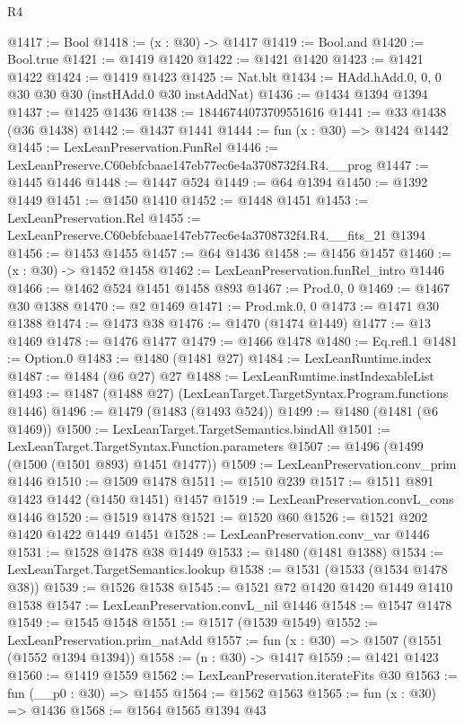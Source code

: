 \begin{lexlean}{R4}
\begin{coremodule}
@1417 := Bool
@1418 := (x : @30) -> @1417
@1419 := Bool.and
@1420 := Bool.true
@1421 := @1419 @1420
@1422 := @1421 @1420
@1423 := @1421 @1422
@1424 := @1419 @1423
@1425 := Nat.blt
@1434 := HAdd.hAdd.{0, 0, 0} @30 @30 @30 (instHAdd.{0} @30 instAddNat)
@1436 := @1434 @1394 @1394
@1437 := @1425 @1436
@1438 := 18446744073709551616
@1441 := @33 @1438 (@36 @1438)
@1442 := @1437 @1441
@1444 := fun (x : @30) => @1424 @1442
@1445 := LexLeanPreservation.FunRel
@1446 := LexLeanPreserve.C60ebfcbaae147eb77ec6e4a3708732f4.R4.__prog
@1447 := @1445 @1446
@1448 := @1447 @524
@1449 := @64 @1394
@1450 := @1392 @1449
@1451 := @1450 @1410
@1452 := @1448 @1451
@1453 := LexLeanPreservation.Rel
@1455 := LexLeanPreserve.C60ebfcbaae147eb77ec6e4a3708732f4.R4.__fits_21 @1394
@1456 := @1453 @1455
@1457 := @64 @1436
@1458 := @1456 @1457
@1460 := (x : @30) -> @1452 @1458
@1462 := LexLeanPreservation.funRel_intro @1446
@1466 := @1462 @524 @1451 @1458 @893
@1467 := Prod.{0, 0}
@1469 := @1467 @30 @1388
@1470 := @2 @1469
@1471 := Prod.mk.{0, 0}
@1473 := @1471 @30 @1388
@1474 := @1473 @38
@1476 := @1470 (@1474 @1449)
@1477 := @13 @1469
@1478 := @1476 @1477
@1479 := @1466 @1478
@1480 := Eq.refl.{1}
@1481 := Option.{0}
@1483 := @1480 (@1481 @27)
@1484 := LexLeanRuntime.index
@1487 := @1484 (@6 @27) @27
@1488 := LexLeanRuntime.instIndexableList
@1493 := @1487 (@1488 @27) (LexLeanTarget.TargetSyntax.Program.functions @1446)
@1496 := @1479 (@1483 (@1493 @524))
@1499 := @1480 (@1481 (@6 @1469))
@1500 := LexLeanTarget.TargetSemantics.bindAll
@1501 := LexLeanTarget.TargetSyntax.Function.parameters
@1507 := @1496 (@1499 (@1500 (@1501 @893) @1451 @1477))
@1509 := LexLeanPreservation.conv_prim @1446
@1510 := @1509 @1478
@1511 := @1510 @239
@1517 := @1511 @891 @1423 @1442 (@1450 @1451) @1457
@1519 := LexLeanPreservation.convL_cons @1446
@1520 := @1519 @1478
@1521 := @1520 @60
@1526 := @1521 @202 @1420 @1422 @1449 @1451
@1528 := LexLeanPreservation.conv_var @1446
@1531 := @1528 @1478 @38 @1449
@1533 := @1480 (@1481 @1388)
@1534 := LexLeanTarget.TargetSemantics.lookup
@1538 := @1531 (@1533 (@1534 @1478 @38))
@1539 := @1526 @1538
@1545 := @1521 @72 @1420 @1420 @1449 @1410 @1538
@1547 := LexLeanPreservation.convL_nil @1446
@1548 := @1547 @1478
@1549 := @1545 @1548
@1551 := @1517 (@1539 @1549)
@1552 := LexLeanPreservation.prim_natAdd
@1557 := fun (x : @30) => @1507 (@1551 (@1552 @1394 @1394))
@1558 := (n : @30) -> @1417
@1559 := @1421 @1423
@1560 := @1419 @1559
@1562 := LexLeanPreservation.iterateFits @30
@1563 := fun (__p0 : @30) => @1455
@1564 := @1562 @1563
@1565 := fun (x : @30) => @1436
@1568 := @1564 @1565 @1394 @43

\end{coremodule}
\end{lexlean}
